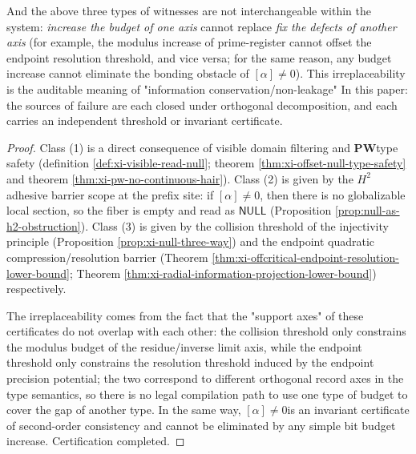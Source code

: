 \begin{theorem}
\begin{enumerate}
\begin{itemize}
  \end{itemize}
\end{enumerate}
And the above three types of witnesses are not interchangeable within the system: \emph {increase the budget of one axis} cannot replace \emph {fix the defects of another axis} (for example, the modulus increase of prime-register cannot offset the endpoint resolution threshold, and vice versa; for the same reason, any budget increase cannot eliminate the bonding obstacle of \([\alpha]\neq 0\)).
This irreplaceability is the auditable meaning of "information conservation/non-leakage" In this paper: the sources of failure are each closed under orthogonal decomposition, and each carries an independent threshold or invariant certificate.
\end{theorem}

\begin{proof}
Class (1) is a direct consequence of visible domain filtering and \(\mathbf{PW}\) ​​type safety (definition \ref{def:xi-visible-read-null}; theorem \ref{thm:xi-offset-null-type-safety} and theorem \ref{thm:xi-pw-no-continuous-hair}).
Class (2) is given by the \(H^2\) ​​adhesive barrier scope at the prefix site: if \([\alpha]\neq 0\), then there is no globalizable local section, so the fiber is empty and read as \(\mathsf{NULL}\) (Proposition \ref{prop:null-as-h2-obstruction}).
Class (3) is given by the collision threshold of the injectivity principle (Proposition \ref{prop:xi-null-three-way}) and the endpoint quadratic compression/resolution barrier (Theorem \ref{thm:xi-offcritical-endpoint-resolution-lower-bound}; Theorem \ref{thm:xi-radial-information-projection-lower-bound}) respectively.
\par
The irreplaceability comes from the fact that the "support axes" of these certificates do not overlap with each other: the collision threshold only constrains the modulus budget of the residue/inverse limit axis, while the endpoint threshold only constrains the resolution threshold induced by the endpoint precision potential; the two correspond to different orthogonal record axes in the type semantics, so there is no legal compilation path to use one type of budget to cover the gap of another type.
In the same way, \([\alpha]\neq 0\) ​​is an invariant certificate of second-order consistency and cannot be eliminated by any simple bit budget increase.
Certification completed.
\end{proof}




